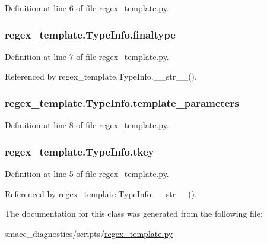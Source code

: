 Definition at line 6 of file regex\+\_\+template.\+py.

\subsubsection[{\texorpdfstring{finaltype}{finaltype}}]{\setlength{\rightskip}{0pt plus 5cm}regex\+\_\+template.\+Type\+Info.\+finaltype}\hypertarget{classregex__template_1_1TypeInfo_a7a95ce84d210a4c19a6b6b025fded915}{}\label{classregex__template_1_1TypeInfo_a7a95ce84d210a4c19a6b6b025fded915}


Definition at line 7 of file regex\+\_\+template.\+py.



Referenced by regex\+\_\+template.\+Type\+Info.\+\_\+\+\_\+str\+\_\+\+\_\+().

\subsubsection[{\texorpdfstring{template\+\_\+parameters}{template_parameters}}]{\setlength{\rightskip}{0pt plus 5cm}regex\+\_\+template.\+Type\+Info.\+template\+\_\+parameters}\hypertarget{classregex__template_1_1TypeInfo_a6b61480cfa79fe1e43df6e0063b3f7de}{}\label{classregex__template_1_1TypeInfo_a6b61480cfa79fe1e43df6e0063b3f7de}


Definition at line 8 of file regex\+\_\+template.\+py.

\subsubsection[{\texorpdfstring{tkey}{tkey}}]{\setlength{\rightskip}{0pt plus 5cm}regex\+\_\+template.\+Type\+Info.\+tkey}\hypertarget{classregex__template_1_1TypeInfo_a28a57ea9411ccf02c14c3936403e76c6}{}\label{classregex__template_1_1TypeInfo_a28a57ea9411ccf02c14c3936403e76c6}


Definition at line 5 of file regex\+\_\+template.\+py.



Referenced by regex\+\_\+template.\+Type\+Info.\+\_\+\+\_\+str\+\_\+\+\_\+().



The documentation for this class was generated from the following file\+:\begin{DoxyCompactItemize}
\item 
smacc\+\_\+diagnostics/scripts/\hyperlink{regex__template_8py}{regex\+\_\+template.\+py}\end{DoxyCompactItemize}
